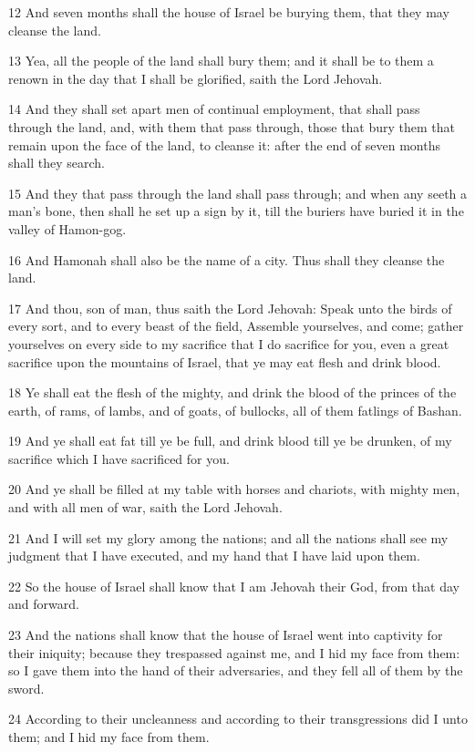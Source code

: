 \par 12 And seven months shall the house of Israel be burying them, that they may cleanse the land.
\par 13 Yea, all the people of the land shall bury them; and it shall be to them a renown in the day that I shall be glorified, saith the Lord Jehovah.
\par 14 And they shall set apart men of continual employment, that shall pass through the land, and, with them that pass through, those that bury them that remain upon the face of the land, to cleanse it: after the end of seven months shall they search.
\par 15 And they that pass through the land shall pass through; and when any seeth a man's bone, then shall he set up a sign by it, till the buriers have buried it in the valley of Hamon-gog.
\par 16 And Hamonah shall also be the name of a city. Thus shall they cleanse the land.
\par 17 And thou, son of man, thus saith the Lord Jehovah: Speak unto the birds of every sort, and to every beast of the field, Assemble yourselves, and come; gather yourselves on every side to my sacrifice that I do sacrifice for you, even a great sacrifice upon the mountains of Israel, that ye may eat flesh and drink blood.
\par 18 Ye shall eat the flesh of the mighty, and drink the blood of the princes of the earth, of rams, of lambs, and of goats, of bullocks, all of them fatlings of Bashan.
\par 19 And ye shall eat fat till ye be full, and drink blood till ye be drunken, of my sacrifice which I have sacrificed for you.
\par 20 And ye shall be filled at my table with horses and chariots, with mighty men, and with all men of war, saith the Lord Jehovah.
\par 21 And I will set my glory among the nations; and all the nations shall see my judgment that I have executed, and my hand that I have laid upon them.
\par 22 So the house of Israel shall know that I am Jehovah their God, from that day and forward.
\par 23 And the nations shall know that the house of Israel went into captivity for their iniquity; because they trespassed against me, and I hid my face from them: so I gave them into the hand of their adversaries, and they fell all of them by the sword.
\par 24 According to their uncleanness and according to their transgressions did I unto them; and I hid my face from them.

